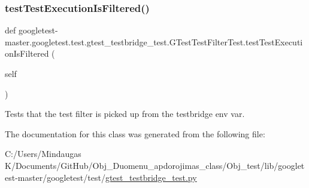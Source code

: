 \subsubsection{\texorpdfstring{testTestExecutionIsFiltered()}{testTestExecutionIsFiltered()}}
{\footnotesize\ttfamily def googletest-\/master.\+googletest.\+test.\+gtest\+\_\+testbridge\+\_\+test.\+G\+Test\+Test\+Filter\+Test.\+test\+Test\+Execution\+Is\+Filtered (\begin{DoxyParamCaption}\item[{}]{self }\end{DoxyParamCaption})}

\begin{DoxyVerb}Tests that the test filter is picked up from the testbridge env var.\end{DoxyVerb}
 

The documentation for this class was generated from the following file\+:\begin{DoxyCompactItemize}
\item 
C\+:/\+Users/\+Mindaugas K/\+Documents/\+Git\+Hub/\+Obj\+\_\+\+Duomenu\+\_\+apdorojimas\+\_\+class/\+Obj\+\_\+test/lib/googletest-\/master/googletest/test/\mbox{\hyperlink{_obj__test_2lib_2googletest-master_2googletest_2test_2gtest__testbridge__test_8py}{gtest\+\_\+testbridge\+\_\+test.\+py}}\end{DoxyCompactItemize}
